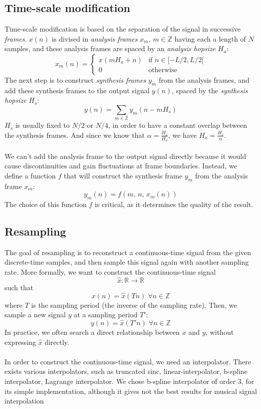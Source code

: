 \documentclass[letterpaper]{article}
\begin{document}
\subsection{Time-scale modification}
Time-scale modification is based on the separation of the signal in successive
\emph{frames}. \(x(n)\) is divised in \emph{analysis frames}
\(x_m,\,m\in\mathbb{Z}\) having each a length of \(N\) samples, and these
analysis frames are spaced by an \emph{analysis hopsize} \(H_a\):
\[x_m(n)=\begin{cases}
	x(mH_a + n) & \text{if }n\in [-L/2, L/2[ \\
	0           & \text{otherwise}
\end{cases}\]
The next step is to construct \emph{synthesis frames} \(y_m\) from the analysis
frames, and add these synthesis frames to the output signal \(y(n)\), spaced by
the \emph{synthesis hopsize} \(H_s\):
\[y(n) = \sum_{m\in\mathbb{Z}}y_m(n-mH_s)\]
\(H_s\) is usually fixed to \(N/2\) or \(N/4\), in order to have a constant
overlap between the synthesis frames. And since we know that
\(\alpha=\frac{H_s}{H_a}\), we have \(H_a=\frac{H_s}{\alpha}\).
\paragraph{}
We can't add the analysis frame to the output signal directly because it would
cause discontinuities and gain fluctuations at frame boundaries. Instead, we
define a function \(f\) that will construct the synthesis frame \(y_m\) from the
analysis frame \(x_m\):
\[y_m(n)=f(m,\,n,\,x_m(n))\]
The choice of this function \(f\) is critical, as it determines the quality of
the result.
\subsection{Resampling}
The goal of resampling is to reconstruct a continuous-time signal from the given
discrete-time samples, and then sample this signal again with another sampling
rate. More formally, we want to construct the continuous-time signal
\[\hat x:\mathbb{R}\to\mathbb{R}\]
such that
\[x(n) = \hat x(Tn) \;\forall n\in\mathbb{Z}\]
where \(T\) is the sampling period (the inverse of the sampling rate). Then, we
sample a new signal \(y\) at a sampling period \(T'\):
\[y(n) = \hat x(T'n) \;\forall n\in\mathbb{Z}\]
In practice, we often search a direct relationship between \(x\) and \(y\),
without expressing \(\hat x\) directly.
\paragraph{}
In order to construct the continuous-time signal, we need an interpolator. There
exists various interpolators, such as truncated sinc, linear-interpolator,
b-spline interpolator, Lagrange interpolator. We chose b-spline interpolator of
order 3, for its simple implementation, although it gives not the best results
for musical signal interpolation
\end{document}
